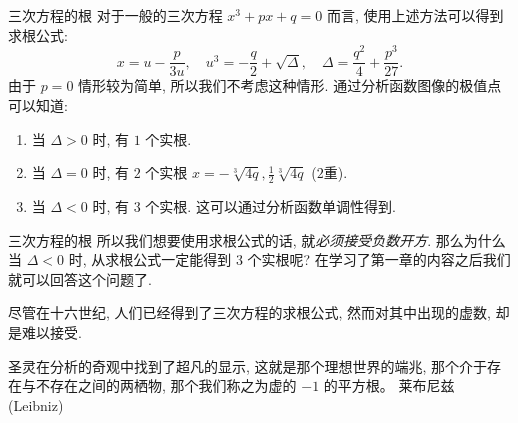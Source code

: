 \begin{frame}{三次方程的根}
\onslide<+->对于一般的三次方程 $x^3+px+q=0$ 而言, 使用上述方法可以得到求根公式:
\[x=u-\frac p{3u},\quad u^3=-\frac q2+\sqrt{\Delta},\quad \Delta=\frac{q^2}4+\frac{p^3}{27}.\]
\onslide<+->由于 $p=0$ 情形较为简单, 所以我们不考虑这种情形.
\onslide<+->通过分析函数图像的极值点可以知道:
\begin{enumerate}
\item 当 $\Delta>0$ 时, 有 $1$ 个实根.
\item 当 $\Delta=0$ 时, 有 $2$ 个实根 $x=-\sqrt[3]{4q},\frac12\sqrt[3]{4q}$ ($2$重).
\item 当 $\Delta<0$ 时, 有 $3$ 个实根. 这可以通过分析函数单调性得到.
\end{enumerate}

\begin{center}
	\begin{figure}[h]
		\begin{subfigure}{0.3\textwidth}
			\centering
		\end{subfigure}
		\begin{subfigure}{0.3\textwidth}
			\centering
		\end{subfigure}
		\begin{subfigure}{0.3\textwidth}
			\centering
		\end{subfigure}
	\end{figure}
\end{center}
\end{frame}


\begin{frame}{三次方程的根}
\onslide<+->所以我们想要使用求根公式的话, 就\emph{必须接受负数开方}.
\onslide<+->那么为什么当 $\Delta<0$ 时, 从求根公式一定能得到 $3$ 个实根呢?
\onslide<+->在学习了第一章的内容之后我们就可以回答这个问题了.

\onslide<+->尽管在十六世纪, 人们已经得到了三次方程的求根公式, 然而对其中出现的虚数, 却是难以接受.
\onslide<+->
\begin{quote@}
\indent 圣灵在分析的奇观中找到了超凡的显示, 这就是那个理想世界的端兆, 那个介于存在与不存在之间的两栖物, 那个我们称之为虚的 $-1$ 的平方根。
\tcblower
莱布尼兹 (Leibniz)
\end{quote@}
\end{frame}
